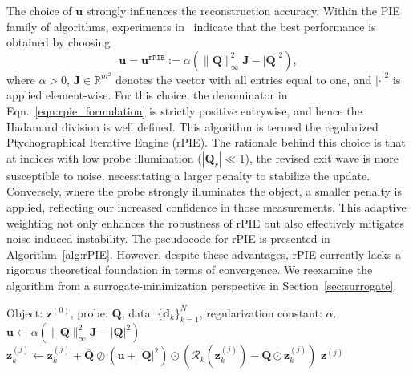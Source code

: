 \documentclass{article}
\numberwithin{equation}{section}
\begin{document}
The choice of $\bm{u}$ strongly influences the reconstruction accuracy. Within the PIE family of algorithms, experiments in~\cite{rPIE} indicate that the best performance is obtained by choosing
\begin{equation*}
    \bm{u} = \bm{u}^{\texttt{rPIE}}
    := \alpha\left(\|\bm{Q}\|^2_{\infty}\bm{J} - |\bm{Q}|^2\right),
\end{equation*}
where $\alpha > 0$, $\bm{J} \in \mathbb{R}^{m^2}$ denotes the vector with all entries equal to one, and $|\cdot|^2$ is applied element-wise. {For this choice, the denominator in Eqn.~\eqref{eqn:rpie_formulation} is strictly positive entrywise, and hence the Hadamard division is well defined.} This algorithm is termed the regularized Ptychographical Iterative Engine (rPIE). The rationale behind this choice is that at indices with low probe illumination ($|\bm{Q}_r|\ll 1$), the revised exit wave is more susceptible to noise, necessitating a larger penalty to stabilize the update. Conversely, where the probe strongly illuminates the object, a smaller penalty is applied, reflecting our increased confidence in those measurements. This adaptive weighting not only enhances the robustness of rPIE but also effectively mitigates noise-induced instability. The pseudocode for rPIE is presented in Algorithm~\ref{alg:rPIE}. However, despite these advantages, rPIE currently lacks a rigorous theoretical foundation in terms of convergence. {We reexamine the algorithm from a surrogate-minimization perspective in Section~\ref{sec:surrogate}.}

\begin{algorithm}
\caption{$\texttt{rPIE}(\bm{z}^{(0)},\bm{Q},\{\bm{d}_k\}_{k=1}^N,\alpha)$}\label{alg:rPIE}
\begin{algorithmic}[1]
\REQUIRE Object: $\bm{z}^{(0)}$, probe: $\bm{Q}$, data: $\{\bm{d}_k\}_{k=1}^N$, regularization constant: $\alpha$.
\STATE $\bm{u} \leftarrow \alpha\left(\|\bm{Q}\|^2_{\infty}\bm{J} - |\bm{Q}|^2\right)$
        \STATE $\bm{z}_k^{(j)}\leftarrow \bm{z}_k^{(j)} + \overline{\bm{Q}}\oslash\left(\bm{u} + |\bm{Q}|^2\right)\odot\left(\mathcal{R}_k\left(\bm{z}_k^{(j)}\right) - \bm{Q}\odot\bm{z}_k^{(j)}\right)$
    \ENDFOR
\ENDWHILE
\RETURN $\bm{z}^{(j)}$
\end{algorithmic}
\end{algorithm}
\end{document}
